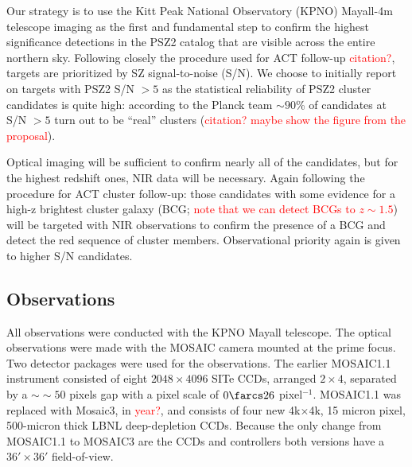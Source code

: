 \documentclass[apj, revtex4]{emulateapj}
\newcommand{\editorial}[1]{\textcolor{red}{#1}}
\begin{document}
Our strategy is to use the Kitt Peak National Observatory (KPNO) Mayall-4m telescope imaging as the first and fundamental step to confirm the highest significance detections in the PSZ2 catalog that are visible across the entire northern sky. Following closely the procedure used for ACT follow-up \editorial{citation?}, targets are prioritized by SZ signal-to-noise (S/N). We choose to initially report on targets with PSZ2 S/N $>5$ as the statistical reliability of PSZ2 cluster candidates is quite high: according to the Planck team $\sim90$\% of candidates at S/N $>5$ turn out to be ``real'' clusters (\editorial{citation? maybe show the figure from the proposal}).


Optical imaging will be sufficient to confirm nearly all of the candidates, but for the highest redshift ones, NIR data will be necessary. Again following the procedure for ACT cluster follow-up: those candidates with some evidence for a high-z brightest cluster galaxy (BCG; \editorial{note that we can detect BCGs to $z \sim 1.5$}) will be targeted with NIR observations to confirm the presence of a BCG and detect the red sequence of cluster members. Observational priority again is given to higher S/N candidates. 

\subsection{Observations}\label{sec: observations}
All observations were conducted with the KPNO Mayall telescope. The optical observations were made with the MOSAIC camera mounted at the prime focus. Two detector packages were used for the observations. The earlier MOSAIC1.1 instrument consisted of eight $2048\times4096$ SITe CCDs, arranged $2\times4$, separated by a $∼\sim50$ pixels gap with a pixel scale of $0\farcs26$ pixel$^{-1}$. MOSAIC1.1 was replaced with Mosaic3, in \editorial{year?},  and consists of four new 4k$\times$4k, 15 micron pixel, 500-micron thick LBNL deep-depletion CCDs. Because the only change from MOSAIC1.1 to MOSAIC3 are the CCDs and controllers both versions have a $36' \times 36'$ field-of-view.
\end{document}

